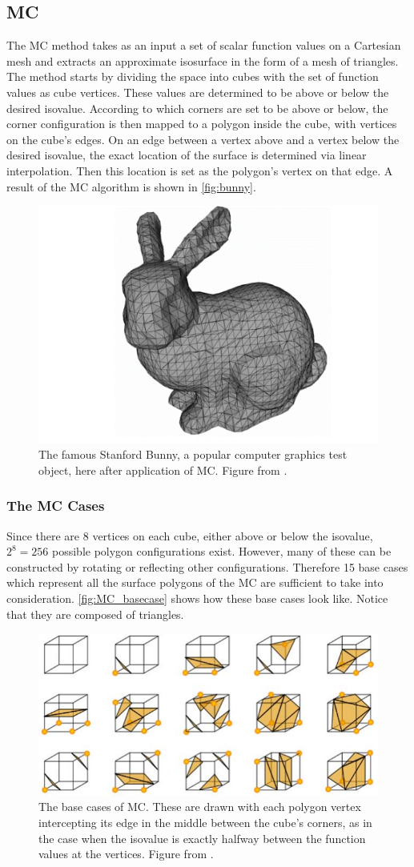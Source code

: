 \subsection{\Acl{MC}} 
The \acf{MC} method \cite{Marching2006} takes as an input a set of scalar function values on a Cartesian mesh and extracts an approximate isosurface in the form of a mesh of triangles. The method starts by dividing the space into cubes with the set of function values as cube vertices. These values are determined to be above or below the desired isovalue. According to which corners are set to be above or below, the corner configuration is then mapped to a polygon inside the cube, with vertices on the cube's edges. On an edge between a vertex above and a vertex below the desired isovalue, the exact location of the surface is determined via linear interpolation. Then this location is set as the polygon's vertex on that edge. A result of the \ac{MC} algorithm is shown in \autoref{fig:bunny}.

\begin{figure}
\centering
   \includegraphics[width=.25\textwidth]{Pictures/SurfaceReconstruction/new_bunny.png}
   \caption{The famous Stanford Bunny, a popular computer graphics test object, here after application of \ac{MC}. Figure from \cite{NielsonParametrization}. }
   \label{fig:bunny}
\end{figure}


\subsubsection{The \acl{MC} Cases}
Since there are 8 vertices on each cube, either above or below the isovalue, $2^8=256$ possible polygon configurations exist. However, many of these can be constructed by rotating or reflecting other configurations. Therefore 15 base cases which represent all the surface polygons of the \acl{MC} are sufficient to take into consideration. \autoref{fig:MC_basecase} shows how these base cases look like. Notice that they are composed of triangles. 

\begin{figure}
\centering
   \includegraphics[width=.5\textwidth]{Pictures/cubes.pdf}
   \caption{The base cases of \ac{MC}. These are drawn with each polygon vertex intercepting its edge in the middle between the cube's corners, as in the case when the isovalue is exactly halfway between the function values at the vertices. Figure from \cite{Marching2006}.}
   \label{fig:MC_basecase}
\end{figure}

